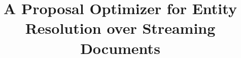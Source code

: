 \documentclass[twoside,leqno,twocolumn]{article}
\newcommand{\eat}[1]{}
\begin{document}
\title{A Proposal Optimizer for Entity Resolution over Streaming Documents}

\eat{%
\author{%
Christan Earl Grant\thanks{Datascience Research Lab, University of Florida; \url{cgrant@cise.ufl.edu}} 
\and 
Daisy Zhe Wang\thanks{Datascience Research Lab, University of Florida; \url{daisyw@cise.ufl.edu}}}
}

\date{}

\maketitle























\end{document}
